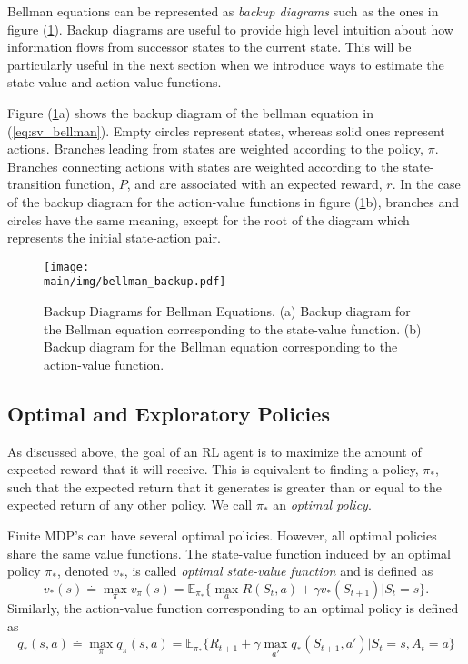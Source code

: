 Bellman equations can be represented as \textit{backup diagrams} such as the ones in figure (\ref{fig:bellman_backup}).
Backup diagrams are useful to provide high level intuition about how information flows from successor states to the current state.
This will be particularly useful  in the next section when we introduce ways to estimate the state-value and action-value functions.

Figure (\ref{fig:bellman_backup}a) shows the backup diagram of the bellman equation in (\ref{eq:sv_bellman}).
Empty circles represent states, whereas solid ones represent actions.
Branches leading from states are weighted according to the policy, $\pi$.
Branches connecting actions with states are weighted according to the state-transition function, $P$, and are associated with an expected reward, $r$. 
In the case of the backup diagram for the action-value functions in figure (\ref{fig:bellman_backup}b), branches and circles have the same meaning, except for the root of the diagram which represents the initial state-action pair.

\begin{figure}
    \centering
    \texttt{[image: \\main/img/bellman\_backup.pdf]}
    \caption[Backup Diagrams for Bellman Equations] {Backup Diagrams for Bellman Equations. 
    (a) Backup diagram for the Bellman equation corresponding to the state-value function.
    (b) Backup diagram for the Bellman equation corresponding to the 
    action-value function.}
    \label{fig:bellman_backup}
\end{figure}


\subsection{Optimal and Exploratory Policies}

As discussed above, the goal of an RL agent is to maximize the amount of expected reward that it will receive. 
This is equivalent to finding a policy, $\pi_*$, such that the expected return that it generates is greater than or equal to the expected return of any other policy.
We call $\pi_*$ an \textit{optimal policy}.

Finite MDP's can have several optimal policies.
However, all optimal policies share the same value functions.
The state-value function induced by an optimal policy $\pi_*$, denoted $v_*$, is called \textit{optimal state-value function} and is defined as
%
\begin{equation}
\label{eq:optimal_svfunc}
v_*(s) \overset{.}{=} \max_\pi v_\pi (s) 
	= \mathbb{E}_{\pi_*}\{ \max_a R(S_t, a) + \gamma v_*(S_{t+1}) | S_t = s \}.
\end{equation}
Similarly, the action-value function corresponding to an optimal policy is defined as 
%
\begin{equation}
\label{eq:optimal_avfunc}
q_*(s,a) \overset{.}{=} \max_\pi q_\pi(s,a) 
	= \mathbb{E}_{\pi_*} \{R_{t+1} + \gamma \max_{a'} q_*(S_{t+1}, a') | S_t = s, A_t =a \}
\end{equation}

